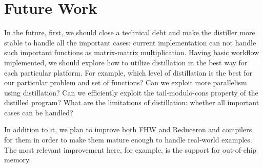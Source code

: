 \section{Future Work}


In the future, first, we should close a technical debt and make the distiller more stable to handle all the important cases: current implementation can not handle such important functions as matrix-matrix multiplication.
Having basic workflow implemented, we should explore how to utilize distillation in the best way for each particular platform. 
For example, which level of distillation is the best for our particular problem and set of functions?
Can we exploit more parallelism using distillation?
Can we efficiently exploit the tail-modulo-cons property of the distilled program?
What are the limitations of distillation: whether all important cases can be handled?


In addition to it, we plan to improve both FHW and Reduceron and compilers for them in order to make them mature enough to handle real-world examples.
The most relevant improvement here, for example, is the support for out-of-chip memory.

